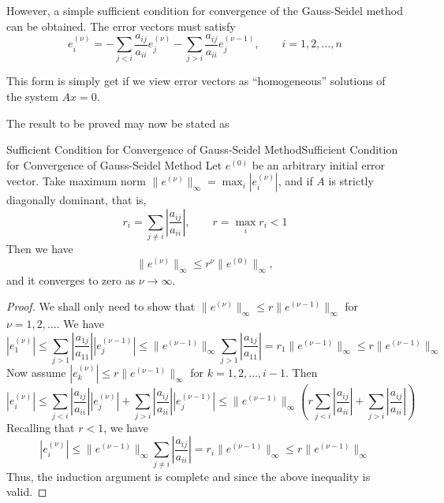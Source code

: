 \documentclass[../main.tex]{subfiles}
\begin{document}
However, a simple sufficient condition for convergence of the Gauss-Seidel method can be obtained. The error vectors must satisfy
\begin{equation*}
	e_i^{(\nu)} = - \sum_{j < i} \frac{a_{ij}}{a_{ii}} e_j^{(\nu)} - \sum_{j > i} \frac{a_{ij}}{a_{ii}} e_j^{(\nu-1)}, \qquad i = 1, 2, \ldots, n
\end{equation*}

\begin{remark}
	This form is simply get if we view error vectors as ``homogeneous'' solutions of the system $A x = 0$.
\end{remark}
The result to be proved may now be stated as
\begin{lemma}{Sufficient Condition for Convergence of Gauss-Seidel Method}{Sufficient Condition for Convergence of Gauss-Seidel Method}
	Let $e^{(0)}$ be an arbitrary initial error vector. Take maximum norm $\| e^{(\nu)} \|_{\infty} = \max_i | e_i^{(\nu)} |$, and if $A$ is strictly diagonally dominant, that is,
	\begin{equation}
		r_i = \sum_{j \neq i} \left| \frac{a_{ij}}{a_{ii}} \right|, \qquad r = \max_i r_i < 1
	\end{equation}
	Then we have
	\begin{equation}
		\| e^{(\nu)} \|_{\infty} \leq r^{\nu} \| e^{(0)} \|_{\infty},
	\end{equation}
	and it converges to zero as $\nu \to \infty$.
\end{lemma}
\begin{proof}
	We shall only need to show that $\| e^{(\nu)} \|_{\infty} \leq r \| e^{(\nu-1)} \|_{\infty}$ for $\nu = 1, 2, \ldots$. We have
	\begin{equation*}
		| e_1^{(\nu)} | \leq \sum_{j > 1} \left| \frac{a_{1j}}{a_{11}} \right| | e_j^{(\nu-1)} | \leq \| e^{(\nu-1)} \|_{\infty} \sum_{j > 1} \left| \frac{a_{1j}}{a_{11}} \right| = r_1 \| e^{(\nu-1)} \|_{\infty} \leq r \| e^{(\nu-1)} \|_{\infty}
	\end{equation*}
	Now assume $| e_k^{(\nu)} | \leq r \| e^{(\nu-1)} \|_{\infty}$ for $k = 1, 2, \ldots, i-1$. Then
	\begin{equation*}
		| e_i^{(\nu)} | \leq \sum_{j < i} \left| \frac{a_{ij}}{a_{ii}} \right| | e_j^{(\nu)} | + \sum_{j > i} \left| \frac{a_{ij}}{a_{ii}} \right| | e_j^{(\nu-1)} | \leq \| e^{(\nu-1)} \|_{\infty} \left( r \sum_{j < i} \left| \frac{a_{ij}}{a_{ii}} \right| + \sum_{j > i} \left| \frac{a_{ij}}{a_{ii}} \right| \right)
	\end{equation*}
	Recalling that $r < 1$, we have
	\begin{equation*}
		| e_i^{(\nu)} | \leq \| e^{(\nu-1)} \|_{\infty} \sum_{j \neq i} \left| \frac{a_{ij}}{a_{ii}} \right| = r_i \| e^{(\nu-1)} \|_{\infty} \leq r \| e^{(\nu-1)} \|_{\infty}
	\end{equation*}
	Thus, the induction argument is complete and since the above inequality is valid.
\end{proof}
\end{document}
